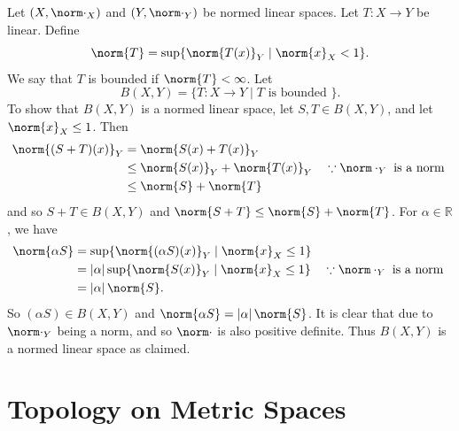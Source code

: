\documentclass[notoc,notitlepage]{tufte-book}
\begin{document}
\begin{eg}
  Let $(X, \norm\cdot_X)$ and $(Y, \norm\cdot_Y)$ be normed linear spaces. Let $T : X \to Y$ be linear. Define
  \begin{equation*}
    \norm{T} = \sup \{ \norm{T(x)}_Y \mid \norm{x}_X < 1 \}.
  \end{equation*}
  We say that $T$ is bounded if $\norm{T} < \infty$. Let
  \begin{equation*}
    B(X, Y) = \{ T : X \to Y \mid T \text{ is bounded } \}.
  \end{equation*}
  To show that $B(X, Y)$ is a normed linear space, let $S, T \in B(X, Y)$, and let $\norm{x}_X \leq 1$. Then
  \begin{align*}
    \norm{(S + T)(x)}_Y &= \norm{S(x) + T(x)}_Y \\
                        &\leq \norm{S(x)}_Y + \norm{T(x)}_Y \quad \because \norm\cdot_Y \text{ is a norm } \\
                        &\leq \norm{S} + \norm{T}
  \end{align*}
  and so $S + T \in B(X, Y)$ and $\norm{S + T} \leq \norm{S} + \norm{T}$. For $\alpha \in \mathbb{R}$, we have
  \begin{align*}
    \norm{\alpha S} &= \sup \{ \norm{(\alpha S)(x)}_Y \mid \norm{x}_X \leq 1 \} \\
                    &= \abs{\alpha} \sup \{ \norm{S(x)}_Y \mid \norm{x}_X \leq 1 \} \quad \because \norm\cdot_Y \text{ is a norm } \\
                    &= \abs{\alpha} \norm{S}.
  \end{align*}
  So $(\alpha S) \in B(X, Y)$ and $\norm{\alpha S} = \abs{\alpha} \norm{S}$. It is clear that due to $\norm\cdot_Y$ being a norm, and so $\norm\cdot$ is also positive definite. Thus $B(X, Y)$ is a normed linear space as claimed.
\end{eg}


\section{Topology on Metric Spaces}%
\label{sec:topology_on_metric_spaces}
\end{document}
